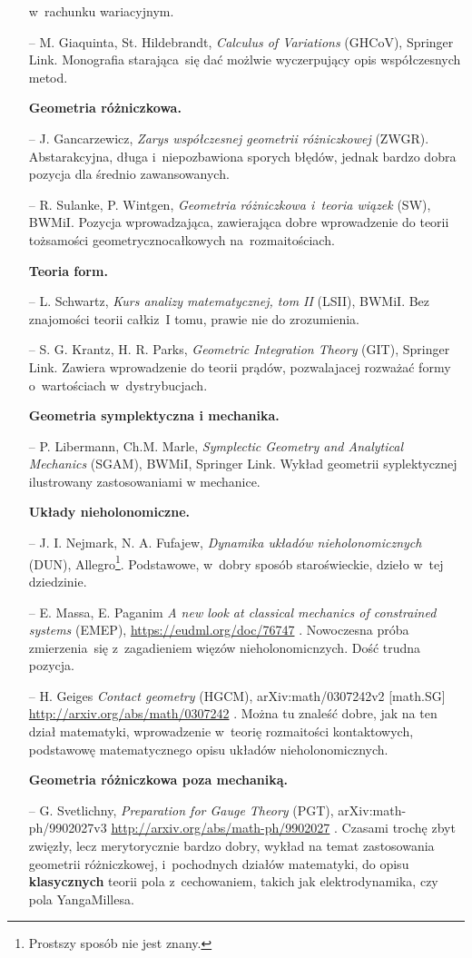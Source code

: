 \documentclass[a4paper,11pt]{article}
\begin{document}
\begin{itemize}
  w~rachunku wariacyjnym.
\item[--] M. Giaquinta, St. Hildebrandt, \emph{Calculus of Variations}
  (GHCoV), Springer Link. Monografia starająca~się dać możlwie
  wyczerpujący opis współczesnych metod.
\item[] \textbf{Geometria różniczkowa.}
\item[--] J. Gancarzewicz, \emph{Zarys współczesnej geometrii
    różniczkowej} (ZWGR). Abstarakcyjna, długa i~niepozbawiona sporych
  błędów, jednak bardzo dobra pozycja dla średnio zawansowanych.
\item[--] R. Sulanke, P. Wintgen, \emph{Geometria różniczkowa i~teoria
    wiązek} (SW), BWMiI. Pozycja wprowadzająca, zawierająca dobre
  wprowadzenie do teorii tożsamości geometryczno\dywiz całkowych
  na~rozmaitościach.
\item[] \textbf{Teoria form.}
\item[--] L. Schwartz, \emph{Kurs analizy matematycznej, tom II}
  (LSII), BWMiI. Bez znajomości teorii całki\linebreak z~I tomu,
  prawie nie do zrozumienia.
\item[--] S. G. Krantz, H. R. Parks, \emph{Geometric Integration
    Theory} (GIT), Springer Link. Zawiera wprowadzenie do teorii
  prądów, pozwalajacej rozważać formy o~wartościach w~dystrybucjach.
\item[] \textbf{Geometria symplektyczna i mechanika.}
\item[--] P. Libermann, Ch.\dywiz M. Marle, \emph{Symplectic Geometry
    and Analytical Mechanics} (SGAM), BWMiI, Springer Link. Wykład
  geometrii syplektycznej ilustrowany zastosowaniami w mechanice.
  \newpage
\item[] \textbf{Układy nieholonomiczne.}
\item[--] J. I. Nejmark, N. A. Fufajew, \emph{Dynamika układów
    nieholonomicznych} (DUN), Allegro\footnote{Prostszy sposób nie
    jest znany.}. Podstawowe, w~dobry sposób staroświeckie, dzieło
  w~tej dziedzinie.
\item[--] E. Massa, E. Paganim \emph{A new look at classical mechanics
    of constrained systems} (EMEP),\newline
  \url{https://eudml.org/doc/76747} . Nowoczesna próba zmierzenia~się
  z~zagadieniem więzów nieholonomicnzych. Dość trudna pozycja.
\item[--] H. Geiges \emph{Contact geometry} (HGCM),
  arXiv:math/0307242v2 [math.SG]
  \url{http://arxiv.org/abs/math/0307242} . Można tu znaleść dobre,
  jak na ten dział matematyki, wprowadzenie w~teorię rozmaitości
  kontaktowych, podstawowę matematycznego opisu układów
  nieholonomicznych.
\item[] \textbf{Geometria różniczkowa poza mechaniką.}
\item[--] G. Svetlichny, \emph{Preparation for Gauge Theory} (PGT),
  arXiv:math-ph/9902027v3 \url{http://arxiv.org/abs/math-ph/9902027} .
  Czasami trochę zbyt zwięzły, lecz merytorycznie bardzo dobry, wykład
  na temat zastosowania geometrii różniczkowej, i~pochodnych działów
  matematyki, do opisu \textbf{klasycznych} teorii pola z~cechowaniem,
  takich jak elektrodynamika, czy pola Yanga\dywiz Millesa.
\end{itemize}
\end{document}
